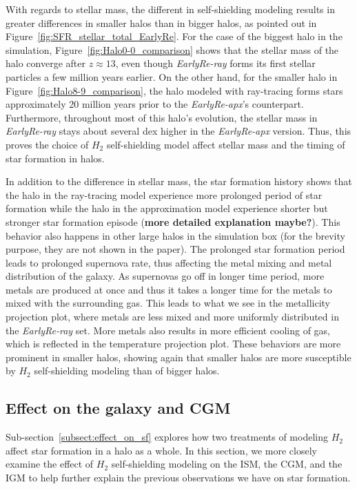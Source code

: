 \documentclass[linenumbers, twocolumn]{aastex631}
\begin{document}
With regards to stellar mass, the different in self-shielding modeling results in greater differences in smaller halos than in bigger halos, as pointed out in Figure~\ref{fig:SFR_stellar_total_EarlyRe}. For the case of the biggest halo in the simulation, Figure~\ref{fig:Halo0-0_comparison} shows that the stellar mass of the halo converge after $z \approx 13$, even though \textit{EarlyRe-ray} forms its first stellar particles a few million years earlier. On the other hand, for the smaller halo in Figure~\ref{fig:Halo8-9_comparison}, the halo modeled with ray-tracing forms stars approximately 20 million years prior to the \textit{EarlyRe-apx}'s counterpart. Furthermore, throughout most of this halo's evolution, the stellar mass in \textit{EarlyRe-ray} stays about several dex higher in the \textit{EarlyRe-apx} version. Thus, this proves the choice of $H_{2}$ self-shielding model affect stellar mass and the timing of star formation in halos. 

In addition to the difference in stellar mass, the star formation history shows that the halo in the ray-tracing model experience more prolonged period of star formation while the halo in the approximation model experience shorter but stronger star formation episode (\textbf{more detailed explanation maybe?}). This behavior also happens in other large halos in the simulation box (for the brevity purpose, they are not shown in the paper). The prolonged star formation period leads to prolonged supernova rate, thus affecting the metal mixing and metal distribution of the galaxy. As supernovas go off in longer time period, more metals are produced at once and thus it takes a longer time for the metals to mixed with the surrounding gas. This leads to what we see in the metallicity projection plot, where metals are less mixed and more uniformly distributed in the \textit{EarlyRe-ray} set. More metals also results in more efficient cooling of gas, which is reflected in the temperature projection plot. These behaviors are more prominent in smaller halos, showing again that smaller halos are more susceptible by $H_{2}$ self-shielding modeling than of bigger halos. 

\subsection{Effect on the galaxy and CGM}
\label{subsect:ISM_CGM}

Sub-section~\ref{subsect:effect_on_sf} explores how two treatments of modeling $H_{2}$ affect star formation in a halo as a whole. In this section, we more closely examine the effect of $H_{2}$ self-shielding modeling on the ISM, the CGM, and the IGM to help further explain the previous observations we have on star formation. 
\end{document}
